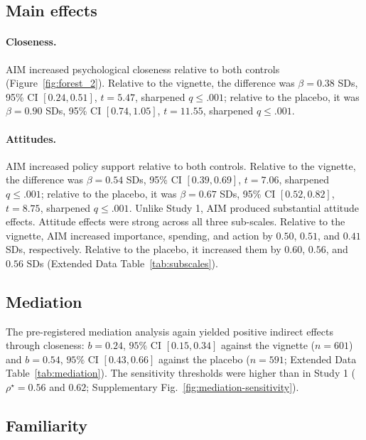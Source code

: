 \documentclass[11pt]{article}
\begin{document}
\subsection{Main effects}
\label{sec:study-2-satellite-cybersecurity-main-effects}

\paragraph{Closeness.} AIM increased psychological closeness relative to both controls (Figure~\ref{fig:forest_2}). Relative to the vignette, the difference was $\beta=0.38$ SDs, 95\% CI $[0.24,0.51]$, $t=5.47$, sharpened $q\leq.001$; relative to the placebo, it was $\beta=0.90$ SDs, 95\% CI $[0.74,1.05]$, $t=11.55$, sharpened $q\leq.001$.

\paragraph{Attitudes.} AIM increased policy support relative to both controls. Relative to the vignette, the difference was $\beta=0.54$ SDs, 95\% CI $[0.39,0.69]$, $t=7.06$, sharpened $q\leq.001$; relative to the placebo, it was $\beta=0.67$ SDs, 95\% CI $[0.52,0.82]$, $t=8.75$, sharpened $q\leq.001$. Unlike Study 1, AIM produced substantial attitude effects. Attitude effects were strong across all three sub-scales. Relative to the vignette, AIM increased importance, spending, and action by $0.50$, $0.51$, and $0.41$ SDs, respectively. Relative to the placebo, it increased them by $0.60$, $0.56$, and $0.56$ SDs (Extended Data Table~\ref{tab:subscales}).



\subsection{Mediation}
\label{sec:study-2-satellite-cybersecurity-mediation}
The pre-registered mediation analysis again yielded positive indirect effects through closeness: $b=0.24$, $95\%$ CI $[0.15,0.34]$ against the vignette ($n=601$) and $b=0.54$, $95\%$ CI $[0.43,0.66]$ against the placebo ($n=591$; Extended Data Table~\ref{tab:mediation}). The sensitivity thresholds were higher than in Study 1 ($\rho^{\star}=0.56$ and $0.62$; Supplementary Fig.~\ref{fig:mediation-sensitivity}).

\subsection{Familiarity}
\label{sec:study-2-satellite-cybersecurity-familiarity}
\end{document}
